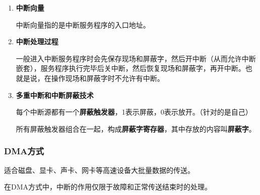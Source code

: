 \documentclass[12pt, a4paper, oneside]{ctexart}
\begin{document}
\begin{enumerate}
  \item {\bf 中断向量}
  
  中断向量指的是中断服务程序的入口地址。

  \item {\bf 中断处理过程}
  
  一般进入中断服务程序时会先保存现场和屏蔽字，然后开中断（从而允许中断嵌套），服务程序执行完毕后关中断，然后恢复现场和屏蔽字，再开中断。也就是说，在操作现场和屏蔽字时不允许有中断。

  \item {\bf 多重中断和中断屏蔽技术}
  
  每个中断源都有一个\textbf{屏蔽触发器}，1表示屏蔽，0表示放开。（针对的是自己）

  所有屏蔽触发器组合在一起，构成\textbf{屏蔽字寄存器}，其中存放的内容叫\textbf{屏蔽字}。
\end{enumerate}

\subsubsection{DMA方式}

适合磁盘、显卡、声卡、网卡等高速设备大批量数据的传送。

在DMA方式中，中断的作用仅限于故障和正常传送结束时的处理。
\end{document}
